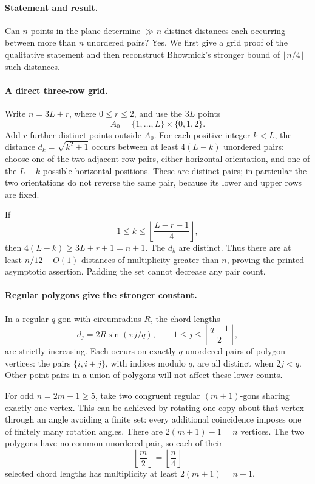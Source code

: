 \paragraph{Statement and result.}
Can \(n\) points in the plane determine \(\gg n\) distinct distances each occurring between more than \(n\) unordered pairs? Yes. We first give a grid proof of the qualitative statement and then reconstruct Bhowmick's stronger bound of \(\lfloor n/4\rfloor\) such distances.

\paragraph{A direct three-row grid.}
Write \(n=3L+r\), where \(0\leq r\leq2\), and use the \(3L\) points
\[
 A_0=\{1,\ldots,L\}\times\{0,1,2\}.
\]
Add \(r\) further distinct points outside \(A_0\). For each positive integer \(k<L\), the distance \(d_k=\sqrt{k^2+1}\) occurs between at least \(4(L-k)\) unordered pairs: choose one of the two adjacent row pairs, either horizontal orientation, and one of the \(L-k\) possible horizontal positions. These are distinct pairs; in particular the two orientations do not reverse the same pair, because its lower and upper rows are fixed.

If
\[
 1\leq k\leq\left\lfloor\frac{L-r-1}{4}\right\rfloor,
\]
then \(4(L-k)\geq3L+r+1=n+1\). The \(d_k\) are distinct. Thus there are at least \(n/12-O(1)\) distances of multiplicity greater than \(n\), proving the printed asymptotic assertion. Padding the set cannot decrease any pair count.

\paragraph{Regular polygons give the stronger constant.}
In a regular \(q\)-gon with circumradius \(R\), the chord lengths
\[
 d_j=2R\sin(\pi j/q),\qquad
 1\leq j\leq\left\lfloor\frac{q-1}{2}\right\rfloor,
\]
are strictly increasing. Each occurs on exactly \(q\) unordered pairs of polygon vertices: the pairs \(\{i,i+j\}\), with indices modulo \(q\), are all distinct when \(2j<q\). Other point pairs in a union of polygons will not affect these lower counts.

For odd \(n=2m+1\geq5\), take two congruent regular \((m+1)\)-gons sharing exactly one vertex. This can be achieved by rotating one copy about that vertex through an angle avoiding a finite set: every additional coincidence imposes one of finitely many rotation angles. There are \(2(m+1)-1=n\) vertices. The two polygons have no common unordered pair, so each of their
\[
 \left\lfloor\frac m2\right\rfloor=\left\lfloor\frac n4\right\rfloor
\]
selected chord lengths has multiplicity at least \(2(m+1)=n+1\).

